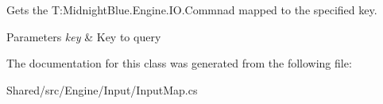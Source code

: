 Gets the T\+:\+Midnight\+Blue.\+Engine.\+I\+O.\+Commnad mapped to the specified key. 


\begin{DoxyParams}{Parameters}
{\em key} & Key to query\\
\hline
\end{DoxyParams}


The documentation for this class was generated from the following file\+:\begin{DoxyCompactItemize}
\item 
Shared/src/\+Engine/\+Input/Input\+Map.\+cs\end{DoxyCompactItemize}
